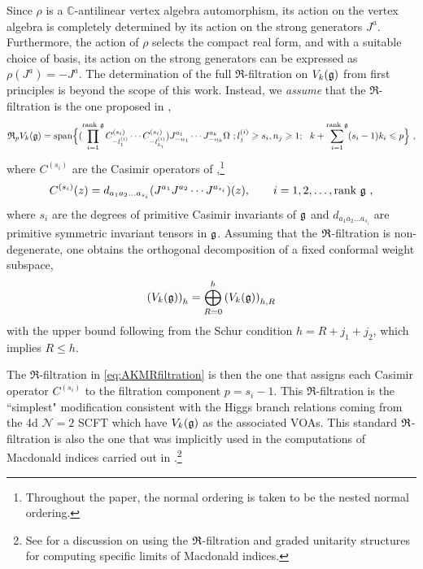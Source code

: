 Since $\rho$ is a $\mathbb{C}$-antilinear vertex algebra automorphism, its action on the vertex algebra is completely determined by its action on the strong generators $J^a$. Furthermore, the action of $\rho$ selects the compact real form, and with a suitable choice of basis, its action on the strong generators can be expressed as $\rho(J^a) = -J^a$. The determination of the full $\mathfrak{R}$-filtration on $V_k(\mathfrak{g})$ from first principles is beyond the scope of this work. Instead, we \emph{assume} that the $\mathfrak{R}$-filtration is the one proposed in \cite{ArabiArdehali:2025fad},
\begin{equation} \label{eq:AKMRfiltration}
\scalebox{0.9}{$\displaystyle
    \mathfrak{R}_p V_k(\gf) = {\rm span}\Big\{ (\prod_{i=1}^{\text{rank}~\gf} C^{(s_i)}_{-l_1^{(i)}} \cdots C^{(s_i)}_{-l_{k_i}^{(i)}}) J^{a_1}_{-n_1} \cdots J^{a_k}_{-n_k}  \Omega~; l_j^{(i)} \geqslant s_i, n_j \geqslant 1; ~~k+\sum_{i=1}^{\text{rank}~\gf}(s_i-1) k_i \leqslant p \Big\}~,
    $}
\end{equation}
where $C^{(s_i)}$ are the Casimir operators of \cite{Bouwknegt:1992wg},\footnote{Throughout the paper, the normal ordering is taken to be the nested normal ordering.}
\begin{equation}
    C^{(s_i)}(z) = d_{a_1 a_2 \ldots a_{s_i}} (J^{a_1} J^{a_2} \cdots J^{a_{s_i}})(z), \qquad i = 1, 2, \ldots, \text{rank}~\mathfrak{g}~,
\end{equation}
where $s_i$ are the degrees of primitive Casimir invariants of $\mathfrak{g}$ and $d_{a_1a_2\ldots a_{s_i}}$ are primitive symmetric invariant tensors in $\mathfrak{g}$. Assuming that the $\mathfrak{R}$-filtration is non-degenerate, one obtains the orthogonal decomposition of a fixed conformal weight subspace, 
\begin{equation} \label{eq:orthogdecomp}
    \left(V_k(\mathfrak{g}) \right)_h = \bigoplus_{R = 0}^h \left(V_k(\mathfrak{g}) \right)_{h,R}
\end{equation}
with the upper bound following from the Schur condition $h = R+j_1+j_2$, which implies $R \leqslant h$.

The $\mathfrak{R}$-filtration in \eqref{eq:AKMRfiltration} is then the one that assigns each Casimir operator $C^{(s_i)}$ to the filtration component $p = s_i - 1$. This $\mathfrak{R}$-filtration is the ``simplest" modification consistent with the Higgs branch relations coming from the 4d $\mathcal{N} = 2$ SCFT which have $V_k(\mathfrak{g})$ as the associated VOAs. This standard $\mathfrak{R}$-filtration is also the one that was implicitly used in the computations of Macdonald indices \cite{Gadde:2011uv} carried out in \cite{Song:2016yfd, kang2026indexnonpointrgflows, Kang:2026ney}.\footnote{See \cite{Jiang:2026ffv} for a discussion on using the $\mathfrak{R}$-filtration and graded unitarity structures for computing specific limits of Macdonald indices.}  

